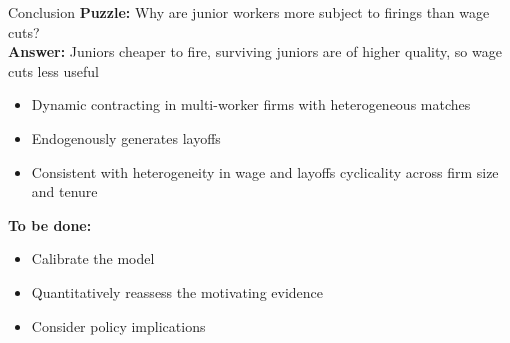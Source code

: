 \documentclass[9pt,aspectratio=169]{beamer} %
\begin{document}
\begin{frame}{Conclusion}
\textbf{Puzzle:} Why are junior workers more subject to firings than wage cuts? \\
\bigskip
\textbf{Answer:} Juniors cheaper to fire, surviving juniors are of higher quality, so wage cuts less useful
\begin{itemize}
    \item Dynamic contracting in multi-worker firms with heterogeneous matches
    \item Endogenously generates layoffs
    \item Consistent with heterogeneity in wage and layoffs cyclicality across firm size and tenure
\end{itemize}
\bigskip
\textbf{To be done:}
\begin{itemize}
    \item Calibrate the model
    \smallskip
    \item Quantitatively reassess the motivating evidence
    \smallskip
    \item Consider policy implications
\end{itemize}
\end{frame}
\end{document}

